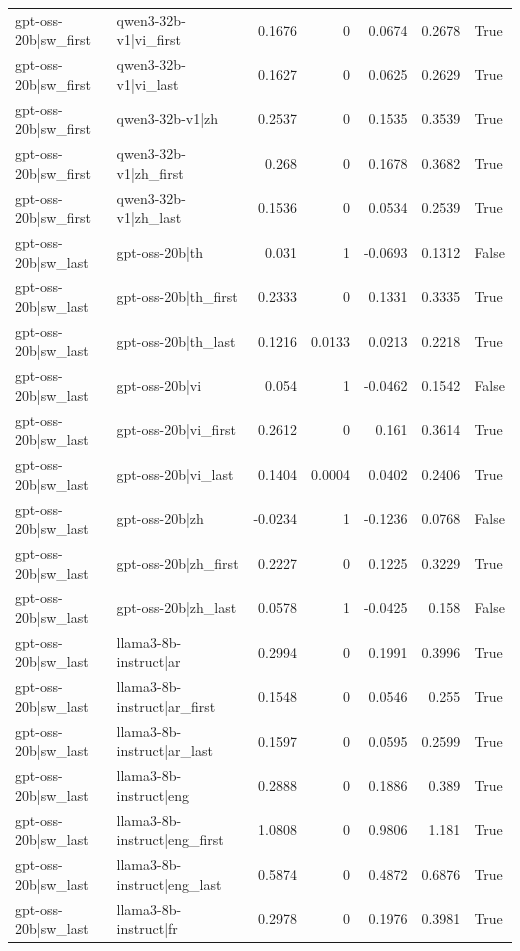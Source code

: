 \begin{table}
\begin{tabular}{l l r r r r l}
gpt-oss-20b|sw_first & qwen3-32b-v1|vi_first & 0.1676 & 0 & 0.0674 & 0.2678 & True \\
gpt-oss-20b|sw_first & qwen3-32b-v1|vi_last & 0.1627 & 0 & 0.0625 & 0.2629 & True \\
gpt-oss-20b|sw_first & qwen3-32b-v1|zh & 0.2537 & 0 & 0.1535 & 0.3539 & True \\
gpt-oss-20b|sw_first & qwen3-32b-v1|zh_first & 0.268 & 0 & 0.1678 & 0.3682 & True \\
gpt-oss-20b|sw_first & qwen3-32b-v1|zh_last & 0.1536 & 0 & 0.0534 & 0.2539 & True \\
gpt-oss-20b|sw_last & gpt-oss-20b|th & 0.031 & 1 & -0.0693 & 0.1312 & False \\
gpt-oss-20b|sw_last & gpt-oss-20b|th_first & 0.2333 & 0 & 0.1331 & 0.3335 & True \\
gpt-oss-20b|sw_last & gpt-oss-20b|th_last & 0.1216 & 0.0133 & 0.0213 & 0.2218 & True \\
gpt-oss-20b|sw_last & gpt-oss-20b|vi & 0.054 & 1 & -0.0462 & 0.1542 & False \\
gpt-oss-20b|sw_last & gpt-oss-20b|vi_first & 0.2612 & 0 & 0.161 & 0.3614 & True \\
gpt-oss-20b|sw_last & gpt-oss-20b|vi_last & 0.1404 & 0.0004 & 0.0402 & 0.2406 & True \\
gpt-oss-20b|sw_last & gpt-oss-20b|zh & -0.0234 & 1 & -0.1236 & 0.0768 & False \\
gpt-oss-20b|sw_last & gpt-oss-20b|zh_first & 0.2227 & 0 & 0.1225 & 0.3229 & True \\
gpt-oss-20b|sw_last & gpt-oss-20b|zh_last & 0.0578 & 1 & -0.0425 & 0.158 & False \\
gpt-oss-20b|sw_last & llama3-8b-instruct|ar & 0.2994 & 0 & 0.1991 & 0.3996 & True \\
gpt-oss-20b|sw_last & llama3-8b-instruct|ar_first & 0.1548 & 0 & 0.0546 & 0.255 & True \\
gpt-oss-20b|sw_last & llama3-8b-instruct|ar_last & 0.1597 & 0 & 0.0595 & 0.2599 & True \\
gpt-oss-20b|sw_last & llama3-8b-instruct|eng & 0.2888 & 0 & 0.1886 & 0.389 & True \\
gpt-oss-20b|sw_last & llama3-8b-instruct|eng_first & 1.0808 & 0 & 0.9806 & 1.181 & True \\
gpt-oss-20b|sw_last & llama3-8b-instruct|eng_last & 0.5874 & 0 & 0.4872 & 0.6876 & True \\
gpt-oss-20b|sw_last & llama3-8b-instruct|fr & 0.2978 & 0 & 0.1976 & 0.3981 & True \\

\end{tabular}
\end{table}
